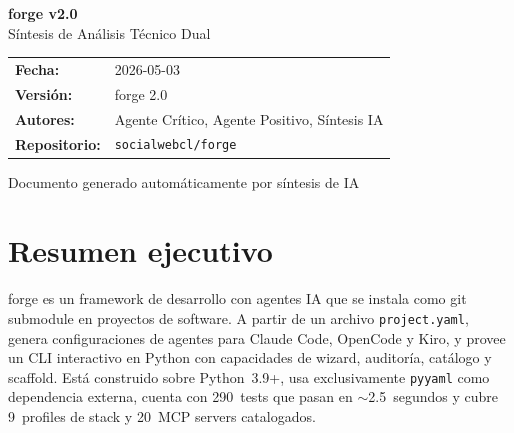 \documentclass[12pt,a4paper]{article}
\begin{document}
\begin{titlepage}
  \centering
  \vspace*{3cm}
  {\Huge\bfseries\color{forgeblue} forge v2.0}\\[0.5cm]
  {\Large S\'intesis de An\'alisis T\'ecnico Dual}\\[2cm]

  \begin{tabular}{ll}
    \textbf{Fecha:}    & 2026-05-03 \\[0.3em]
    \textbf{Versi\'on:} & forge 2.0 \\[0.3em]
    \textbf{Autores:}  & Agente Cr\'itico, Agente Positivo, S\'intesis IA \\[0.3em]
    \textbf{Repositorio:} & \texttt{socialwebcl/forge} \\
  \end{tabular}

  \vspace{2cm}
  \begin{abstract}
    \noindent
    Este documento sintetiza dos an\'alisis t\'ecnicos independientes del framework
    forge v2.0: uno con posici\'on cr\'itica y otro con posici\'on favorable, ambos
    realizados sobre el mismo c\'odigo fuente. La metodolog\'ia dual permite separar
    hechos objetivos del c\'odigo de interpretaciones dependientes del contexto de uso.
    La conclusi\'on no es bin\'aria: el valor de forge depende del perfil del equipo
    que lo adopta.
  \end{abstract}

  \vfill
  {\small\color{codegray} Documento generado autom\'aticamente por s\'intesis de IA}
\end{titlepage}

\tableofcontents
\newpage

\section{Resumen ejecutivo}

forge es un framework de desarrollo con agentes IA que se instala como git submodule en proyectos de software. A partir de un archivo \texttt{project.yaml}, genera configuraciones de agentes para Claude Code, OpenCode y Kiro, y provee un CLI interactivo en Python con capacidades de wizard, auditor\'ia, cat\'alogo y scaffold. Est\'a construido sobre Python~3.9+, usa exclusivamente \texttt{pyyaml} como dependencia externa, cuenta con 290~tests que pasan en $\sim$2.5~segundos y cubre 9~profiles de stack y 20~MCP servers catalogados.
\end{document}

